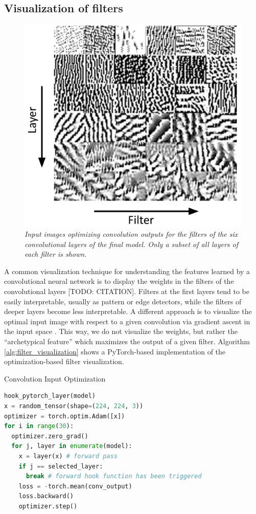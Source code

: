 \documentclass[a4paper]{article}
\begin{document}
\subsection{Visualization of filters}
\label{sec:filter_visualization}
\begin{figure}[t]
     \centering
     \includegraphics[width=.9\linewidth]{graphics/filters}
     \caption{\textit{Input images optimizing convolution outputs for the filters of the six convolutional layers of the final model. Only a subset of all layers of each filter is shown.}}
     \label{fig:filters}
\end{figure}
A common visualization technique for understanding the features learned by a convolutional neural network is to display the weights in the filters of the convolutional layers [TODO: CITATION]. Filters at the first layers tend to be easily interpretable, usually as pattern or edge detectors, while the filters of deeper layers become less interpretable. A different approach is to visualize the optimal input image with respect to a given convolution via gradient ascent in the input space \cite{Erhan2009}. This way, we do not visualize the weights, but rather the \enquote{archetypical feature} which maximizes the output of a given filter. Algorithm \ref{alg:filter_visualization} shows a PyTorch-based implementation of the optimization-based filter visualization.

\begin{algorithm}
     \caption{Convolution Input Optimization}\label{alg:filter_visualization}
     \begin{lstlisting}[language=Python]
hook_pytorch_layer(model)
x = random_tensor(shape=(224, 224, 3))
optimizer = torch.optim.Adam([x])
for i in range(30):
  optimizer.zero_grad()
  for j, layer in enumerate(model):
    x = layer(x) # forward pass
    if j == selected_layer:
      break # forward hook function has been triggered
    loss = -torch.mean(conv_output)
    loss.backward()
    optimizer.step()
     \end{lstlisting}
\end{algorithm}
\end{document}
